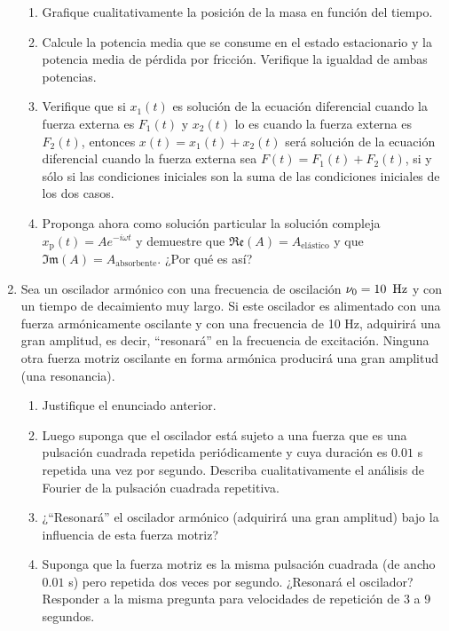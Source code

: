 \documentclass[11pt,spanish]{article}
\begin{document}
\begin{enumerate}
\begin{enumerate}
        \item Grafique cualitativamente la posición de la masa en función del
        tiempo.

        \item Calcule la potencia media que se consume en el estado estacionario
        y la potencia media de pérdida por fricción. Verifique la igualdad
        de ambas potencias.
        
        \item Verifique que si $x_{1}(t)$ es solución de la ecuación diferencial
        cuando la fuerza externa es $F_{1}(t)$ y $x_{2}(t)$ lo es cuando
        la fuerza externa es $F_{2}(t)$, entonces $x(t)=x_{1}(t)+x_{2}(t)$
        será solución de la ecuación diferencial cuando la fuerza externa
        sea $F(t)=F_{1}(t)+F_{2}(t)$, si y sólo si las condiciones iniciales
        son la suma de las condiciones iniciales de los dos casos.
        
        \item Proponga ahora como solución particular la solución compleja
        $x_\text{p}(t)=Ae^{-i\omega t}$ y demuestre que
        $\mathfrak{Re}(A)=A_\text{elástico}$ y que
        $\mathfrak{Im}(A)=A_\text{absorbente}$. ¿Por qué es así?

    \end{enumerate}

    \item Sea un oscilador armónico con una frecuencia de oscilación
    $\nu_{0}=10\mbox{\,\ Hz}$ y con un tiempo de decaimiento muy largo. Si este
    oscilador es alimentado con una fuerza armónicamente oscilante y con una
    frecuencia de 10 Hz, adquirirá una gran amplitud, es decir, ``resonará'' en
    la frecuencia de excitación. Ninguna otra fuerza motriz oscilante en forma
    armónica producirá una gran amplitud (una resonancia). 

    \begin{enumerate}
        \item Justifique el enunciado anterior.

        \item Luego suponga que el oscilador está sujeto a una fuerza que es una
        pulsación cuadrada repetida periódicamente y cuya duración es $0.01$
        s repetida una vez por segundo. Describa cualitativamente el análisis de
        Fourier de la pulsación cuadrada repetitiva.

        \item ¿``Resonará'' el oscilador armónico (adquirirá una gran amplitud)
        bajo la influencia de esta fuerza motriz?
 
        \item Suponga que la fuerza motriz es la misma pulsación cuadrada (de
        ancho $0.01$ s) pero repetida dos veces por segundo. ¿Resonará el
        oscilador? Responder a la misma pregunta para velocidades de repetición
        de 3 a 9 segundos.
    \end{enumerate}

\end{enumerate}
\end{document}
